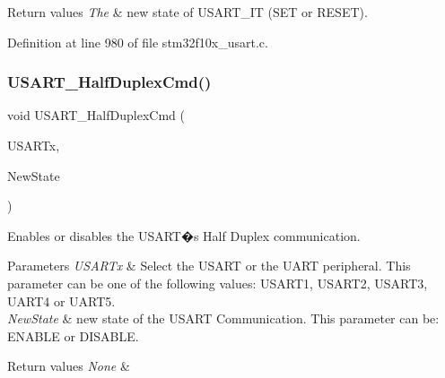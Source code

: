 \begin{DoxyRetVals}{Return values}
{\em The} & new state of U\+S\+A\+R\+T\+\_\+\+IT (S\+ET or R\+E\+S\+ET). \\
\hline
\end{DoxyRetVals}


Definition at line 980 of file stm32f10x\+\_\+usart.\+c.

\mbox{\label{group___u_s_a_r_t___private___functions_gaaa23b05fe0e1896bad90da7f82750831}} 
\subsubsection{\texorpdfstring{U\+S\+A\+R\+T\+\_\+\+Half\+Duplex\+Cmd()}{USART\_HalfDuplexCmd()}}
{\footnotesize\ttfamily void U\+S\+A\+R\+T\+\_\+\+Half\+Duplex\+Cmd (\begin{DoxyParamCaption}\item[{\hyperlink{struct_u_s_a_r_t___type_def}{U\+S\+A\+R\+T\+\_\+\+Type\+Def} $\ast$}]{U\+S\+A\+R\+Tx,  }\item[{\hyperlink{group___exported__types_gac9a7e9a35d2513ec15c3b537aaa4fba1}{Functional\+State}}]{New\+State }\end{DoxyParamCaption})}



Enables or disables the U\+S\+A\+R\+T�s Half Duplex communication. 


\begin{DoxyParams}{Parameters}
{\em U\+S\+A\+R\+Tx} & Select the U\+S\+A\+RT or the U\+A\+RT peripheral. This parameter can be one of the following values\+: U\+S\+A\+R\+T1, U\+S\+A\+R\+T2, U\+S\+A\+R\+T3, U\+A\+R\+T4 or U\+A\+R\+T5. \\
\hline
{\em New\+State} & new state of the U\+S\+A\+RT Communication. This parameter can be\+: E\+N\+A\+B\+LE or D\+I\+S\+A\+B\+LE. \\
\hline
\end{DoxyParams}

\begin{DoxyRetVals}{Return values}
{\em None} & \\
\hline
\end{DoxyRetVals}


